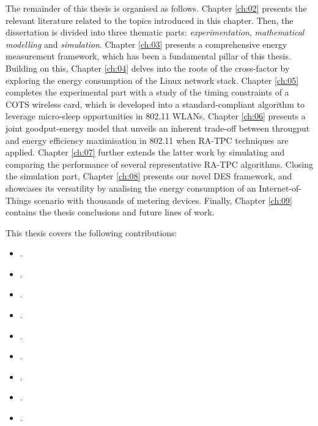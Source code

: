 \documentclass[twoside,nohyper]{tufte-book}
\providecommand{\tightlist}{%
  \setlength{\itemsep}{0pt}\setlength{\parskip}{0pt}}
\begin{document}
The remainder of this thesis is organised as follows. Chapter \ref{ch:02} presents the relevant literature related to the topics introduced in this chapter. Then, the dissertation is divided into three thematic parts: \emph{experimentation}, \emph{mathematical modelling} and \emph{simulation}. Chapter \ref{ch:03} presents a comprehensive energy measurement framework, which has been a fundamental pillar of this thesis. Building on this, Chapter \ref{ch:04} delves into the roots of the cross-factor by exploring the energy consumption of the Linux network stack. Chapter \ref{ch:05} completes the experimental part with a study of the timing constraints of a COTS wireless card, which is developed into a standard-compliant algorithm to leverage micro-sleep opportunities in 802.11 WLANs. Chapter \ref{ch:06} presents a joint goodput-energy model that unveils an inherent trade-off between througput and energy efficiency maximisation in 802.11 when RA-TPC techniques are applied. Chapter \ref{ch:07} further extends the latter work by simulating and comparing the performance of several representative RA-TPC algorithms. Closing the simulation part, Chapter \ref{ch:08} presents our novel DES framework, and showcases its versatility by analising the energy consumption of an Internet-of-Things scenario with thousands of metering devices. Finally, Chapter \ref{ch:09} contains the thesis conclusions and future lines of work.

This thesis covers the following contributions:\vspace{-1mm}

\par

\relax

\begin{itemize}
\tightlist
\item
  .\vspace{8pt}
\item
  .
\item
  .\vspace{8pt}
\item
  .
\item
  .\vspace{8pt}
\item
  .\vspace{8pt}
\item
  .\vspace{8pt}
\item
  .
\item
  .
\end{itemize}
\end{document}
